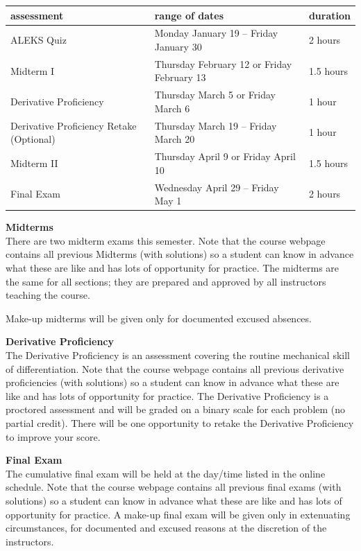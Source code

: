 \documentclass[12pt]{article}
\renewcommand{\emph}[1]{\textsf{\textbf{#1}}}
\newcommand{\localhead}[1]{\par\smallskip\textbf{#1}\nobreak\\}%
\def\heading#1{\localhead{\large\emph{#1}}}
\begin{document}
\begin{center}
\begin{tabular}{| l | l | l |}
\hline
assessment & range of dates & duration \\
\hline \hline
ALEKS Quiz & Monday January 19 -- Friday January 30 & 2 hours\\
\hline
Midterm I & Thursday February 12 or Friday February 13 & 1.5 hours \\
\hline
Derivative Proficiency & Thursday March 5 or Friday March 6 & 1 hour\\
\hline
Derivative Proficiency Retake (Optional) & Thursday March 19 -- Friday March 20 & 1 hour\\
\hline
Midterm II & Thursday April 9 or Friday April 10 & 1.5 hours \\
\hline
Final Exam & Wednesday April 29 -- Friday May 1& 2 hours \\
\hline
\end{tabular}
\end{center}

\heading{Midterms}
There are two midterm exams this semester. Note that the course webpage contains all previous Midterms (with solutions) so a student can know in advance what these are like and has lots of opportunity for practice. The midterms are the same 
for all sections; they are prepared and approved by all instructors teaching the course. 

Make-up midterms will be given only for documented excused absences.\\

\heading{Derivative Proficiency}
The Derivative Proficiency is an assessment covering the routine mechanical skill of differentiation. Note that the course webpage contains all previous derivative proficiencies (with solutions) so a student can know in advance what these are like and has lots of opportunity for practice. The Derivative Proficiency is a proctored assessment and will be graded on a binary scale for each problem (no partial credit). There will be one opportunity to retake the Derivative Proficiency to improve your score.\\

\heading{Final Exam} 
The cumulative final exam will be held at the day/time listed in the
online schedule. Note that the course webpage contains all previous final exams (with solutions) so a student can know in advance what these are like  and has lots of opportunity for practice.
A make-up final exam will be given only in extenuating circumstances, for documented and excused reasons at the discretion of the instructors.
\end{document}
